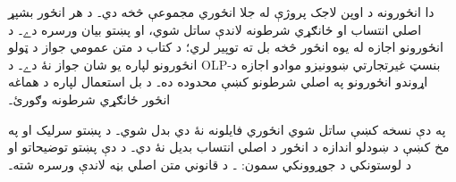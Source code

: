 دا انځورونه د اوپن لاجک پروژې له جلا انځوري مجموعې څخه دي۔ د هر انځور بشپړ اصلي انتساب او ځانګړي شرطونه لاندې ساتل شوي، او پښتو بيان ورسره دے۔ د انځورونو اجازه له يوه انځور څخه بل ته توپير لري؛ د کتاب د متن عمومي  جواز د ټولو انځورونو لپاره يو شان جواز نۀ دے۔ د OLP-بنسټ غيرتجارتي ښوونيزو موادو اجازه د اړوندو انځورونو په اصلي شرطونو کښې محدوده ده۔ د بل استعمال لپاره د هماغه انځور ځانګړي شرطونه وګورئ۔

په دې نسخه کښې ساتل شوي انځوري فايلونه نۀ دي بدل شوي۔ د پښتو سرليک او په مخ کښې د ښودلو اندازه د انځور د اصلي انتساب بديل نۀ دي۔ د دې پښتو توضيحاتو او د لوستونکي د جوړوونکي سمون: ۔ د قانوني متن اصلي بڼه لاندې ورسره شته۔
